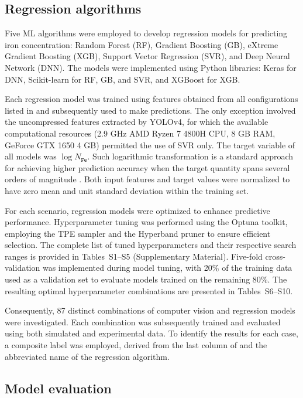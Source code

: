 \documentclass[10pt]{iopart}
\begin{document}
\subsection{Regression algorithms}\label{subsec:RegAlg}

Five ML algorithms were employed to develop regression models for predicting iron concentration: 
Random Forest (RF), Gradient Boosting (GB), eXtreme Gradient Boosting (XGB), Support Vector Regression (SVR), and Deep Neural Network (DNN). 
The models were implemented using Python libraries: Keras for DNN, Scikit-learn for RF, GB, and SVR, and XGBoost for XGB.

Each regression model was trained using features obtained from all configurations listed in  and subsequently used to make predictions. 
The only exception involved the uncompressed features extracted by YOLOv4, for which the available computational resources 
(2.9 GHz AMD Ryzen 7 4800H CPU, 8 GB RAM, GeForce GTX 1650 4 GB) permitted the use of SVR only.
The target variable of all models was $\log N_\mathtt{Fe}$. 
Such logarithmic transformation is a standard approach for achieving higher prediction accuracy 
when the target quantity spans several orders of magnitude \cite{Srivastava2023, Minagawa2024}. 
Both input features and target values were normalized to have zero mean and unit standard deviation within the training set.

For each scenario, regression models were optimized to enhance predictive performance. 
Hyperparameter tuning was performed using the Optuna toolkit, 
employing the TPE sampler and the Hyperband pruner to ensure efficient selection. 
The complete list of tuned hyperparameters and their respective search ranges is provided in Tables~S1–S5 (Supplementary Material). 
Five-fold cross-validation was implemented during model tuning, with 20\% of the training data used as a validation set 
to evaluate models trained on the remaining 80\%. 
The resulting optimal hyperparameter combinations are presented in Tables~S6–S10.

Consequently, 87 distinct combinations of computer vision and regression models were investigated. 
Each combination was subsequently trained and evaluated using both simulated and experimental data. 
To identify the results for each case, a composite label was employed, derived from the last column of  
and the abbreviated name of the regression algorithm.


\subsection{Model evaluation}\label{subsec:ModEva}
\end{document}
